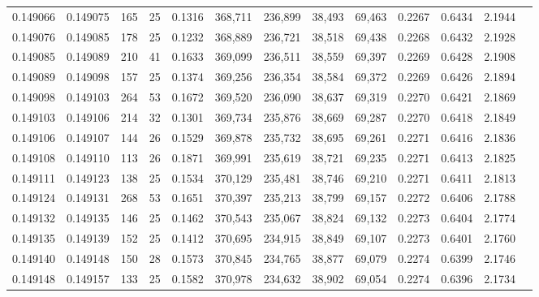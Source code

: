 \begin{tabular}{rrrrrrrrrrrrr}
0.149066 & 0.149075 & 165 &  25 &                                     0.1316 & 368,711 & 236,899 &  38,493 &  69,463 & 0.2267 & 0.6434 & 2.1944 \\
0.149076 & 0.149085 & 178 &  25 &                                     0.1232 & 368,889 & 236,721 &  38,518 &  69,438 & 0.2268 & 0.6432 & 2.1928 \\
0.149085 & 0.149089 & 210 &  41 &                                     0.1633 & 369,099 & 236,511 &  38,559 &  69,397 & 0.2269 & 0.6428 & 2.1908 \\
0.149089 & 0.149098 & 157 &  25 &                                     0.1374 & 369,256 & 236,354 &  38,584 &  69,372 & 0.2269 & 0.6426 & 2.1894 \\
0.149098 & 0.149103 & 264 &  53 &                                     0.1672 & 369,520 & 236,090 &  38,637 &  69,319 & 0.2270 & 0.6421 & 2.1869 \\
0.149103 & 0.149106 & 214 &  32 &                                     0.1301 & 369,734 & 235,876 &  38,669 &  69,287 & 0.2270 & 0.6418 & 2.1849 \\
0.149106 & 0.149107 & 144 &  26 &                                     0.1529 & 369,878 & 235,732 &  38,695 &  69,261 & 0.2271 & 0.6416 & 2.1836 \\
0.149108 & 0.149110 & 113 &  26 &                                     0.1871 & 369,991 & 235,619 &  38,721 &  69,235 & 0.2271 & 0.6413 & 2.1825 \\
0.149111 & 0.149123 & 138 &  25 &                                     0.1534 & 370,129 & 235,481 &  38,746 &  69,210 & 0.2271 & 0.6411 & 2.1813 \\
0.149124 & 0.149131 & 268 &  53 &                                     0.1651 & 370,397 & 235,213 &  38,799 &  69,157 & 0.2272 & 0.6406 & 2.1788 \\
0.149132 & 0.149135 & 146 &  25 &                                     0.1462 & 370,543 & 235,067 &  38,824 &  69,132 & 0.2273 & 0.6404 & 2.1774 \\
0.149135 & 0.149139 & 152 &  25 &                                     0.1412 & 370,695 & 234,915 &  38,849 &  69,107 & 0.2273 & 0.6401 & 2.1760 \\
0.149140 & 0.149148 & 150 &  28 &                                     0.1573 & 370,845 & 234,765 &  38,877 &  69,079 & 0.2274 & 0.6399 & 2.1746 \\
0.149148 & 0.149157 & 133 &  25 &                                     0.1582 & 370,978 & 234,632 &  38,902 &  69,054 & 0.2274 & 0.6396 & 2.1734 \\

\end{tabular}
